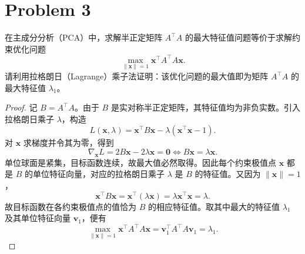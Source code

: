 \section*{Problem 3}

在主成分分析（PCA）中，求解半正定矩阵 $A^\top A$ 的最大特征值问题等价于求解约束优化问题
\[
    \max_{\|\bm{x}\| = 1}\bm{x}^\top A^\top A\bm{x}.
\]
请利用拉格朗日（Lagrange）乘子法证明：该优化问题的最大值即为矩阵 $A^\top A$ 的最大特征值 $\lambda_1$。

\begin{proof}
    记 $B = A^\top A$。由于 $B$ 是实对称半正定矩阵，其特征值均为非负实数。引入拉格朗日乘子 $\lambda$，构造
    \[
        L(\bm{x}, \lambda)
        = \bm{x}^\top B\bm{x}
          - \lambda\left(\bm{x}^\top\bm{x} - 1\right).
    \]
    对 $\bm{x}$ 求梯度并令其为零，得到
    \[
        \nabla_{\bm{x}}L
        = 2B\bm{x} - 2\lambda\bm{x}
        = \bm{0}
        \iff
        B\bm{x} = \lambda\bm{x}.
    \]
    单位球面是紧集，目标函数连续，故最大值必然取得。因此每个约束极值点 $\bm{x}$ 都是 $B$ 的单位特征向量，对应的拉格朗日乘子 $\lambda$ 是 $B$ 的特征值。又因为 $\|\bm{x}\| = 1$，
    \[
        \bm{x}^\top B\bm{x}
        = \bm{x}^\top\left(\lambda\bm{x}\right)
        = \lambda\bm{x}^\top\bm{x}
        = \lambda.
    \]
    故目标函数在各约束极值点的值恰为 $B$ 的相应特征值。取其中最大的特征值 $\lambda_1$ 及其单位特征向量 $\bm{v}_1$，便有
    \[
        \max_{\|\bm{x}\| = 1}\bm{x}^\top A^\top A\bm{x}
        = \bm{v}_1^\top A^\top A\bm{v}_1
        = \boxed{\lambda_1}.
    \]
\end{proof}
